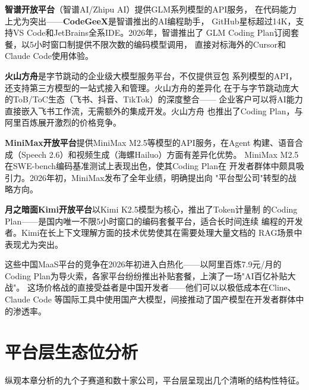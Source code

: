 \textbf{智谱开放平台}（智谱AI/Zhipu AI）提供GLM系列模型的API服务，
在代码能力上尤为突出——\textbf{CodeGeeX}是智谱推出的AI编程助手，
GitHub星标超过14K，支持VS Code和JetBrains全系IDE。2026年，智谱推出了
GLM Coding Plan订阅套餐，以5小时窗口制提供不限次数的编码模型调用，
直接对标海外的Cursor和Claude Code使用体验。

\textbf{火山方舟}是字节跳动的企业级大模型服务平台，不仅提供豆包
系列模型的API，还支持第三方模型的一站式接入和管理。火山方舟的差异化
在于与字节跳动庞大的ToB/ToC生态（飞书、抖音、TikTok）的深度整合——
企业客户可以将AI能力直接嵌入飞书工作流，无需额外的集成开发。火山方舟
也推出了Coding Plan，与阿里百炼展开激烈的价格竞争。

\textbf{MiniMax开放平台}提供MiniMax M2.5等模型的API服务，在Agent
构建、语音合成（Speech 2.6）和视频生成（海螺Hailuo）方面有差异化优势。
MiniMax M2.5在SWE-bench编码基准测试上表现出色，使其Coding Plan在
开发者群体中颇具吸引力。2026年初，MiniMax发布了全年业绩，明确提出向
"平台型公司"转型的战略方向。

\textbf{月之暗面Kimi开放平台}以Kimi K2.5模型为核心，推出了Token计量制
的Coding Plan——是国内唯一不限5小时窗口的编码套餐平台，适合长时间连续
编程的开发者。Kimi在长上下文理解方面的技术优势使其在需要处理大量文档的
RAG场景中表现尤为突出。

这些中国MaaS平台的竞争在2026年初进入白热化——以阿里百炼7.9元/月的Coding
Plan为导火索，各家平台纷纷推出补贴套餐，上演了一场"AI百亿补贴大战"。
这场价格战的直接受益者是中国开发者——他们可以以极低成本在Cline、Claude Code
等国际工具中使用国产大模型，间接推动了国产模型在开发者群体中的渗透率。



\section{平台层生态位分析}
\label{sec:platform-landscape}

纵观本章分析的九个子赛道和数十家公司，平台层呈现出几个清晰的结构性特征。


